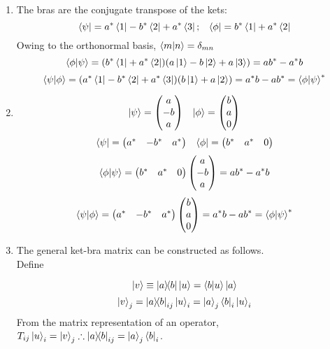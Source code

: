 \begin{sol}
\begin{enumerate}[label=\textbf{(\alph*)}]
\item
The bras are the conjugate transpose of the kets:
$$\bra{\psi}=a^*\bra{1}-b^*\bra{2}+a^*\bra{3};\,\,\,\,\,\bra{\phi}=b^*\bra 1+a^*\bra 2$$
Owing to the orthonormal basis, $\braket{m}{n}=\delta_{mn}$
$$\braket{\phi}{\psi}=(b^*\bra 1+a^*\bra 2)(a\ket 1-b\ket 2+a\ket 3)=ab^*-a^*b$$
$$\braket{\psi}{\phi}=(a^*\bra{1}-b^*\bra{2}+a^*\bra{3})(b\ket 1+a\ket 2)=a^*b-ab^*=\braket{\phi}{\psi}^*$$
\item
$$\ket\psi=\begin{pmatrix}a\\-b\\a\end{pmatrix}\,\,\,\,\,\ket\phi=\begin{pmatrix}b\\a\\0\end{pmatrix}$$
$$\bra{\psi}=\begin{pmatrix}a^*&-b^*&a^*\end{pmatrix}\,\,\,\,\,\bra\phi=\begin{pmatrix}b^*&a^*&0\end{pmatrix}$$ 
$$\braket{\phi}{\psi}=\begin{pmatrix}b^*&a^*&0\end{pmatrix}\begin{pmatrix}a\\-b\\a\end{pmatrix}=ab^*-a^*b$$
$$\braket{\psi}{\phi}=\begin{pmatrix}a^*&-b^*&a^*\end{pmatrix}\begin{pmatrix}b\\a\\0\end{pmatrix}=a^*b-ab^*=\braket{\phi}{\psi}^*$$ 
\item
The general ket-bra matrix can be constructed as follows. \\
Define

$$\ket v\equiv\ketbra{a}{b}\ket{u}=\braket{b}{u}\ket{a}$$ 
$$\ket v_j=\ketbra{a}{b}_{ij}\ket{u}_i=\ket a_j\bra b_i\ket u_i$$ 
From the matrix representation of an operator, $T_{ij}\ket u_i=\ket v_j\therefore\ketbra{a}{b}_{ij}=\ket a_j\bra b_i$.



\end{enumerate}
\end{sol}
